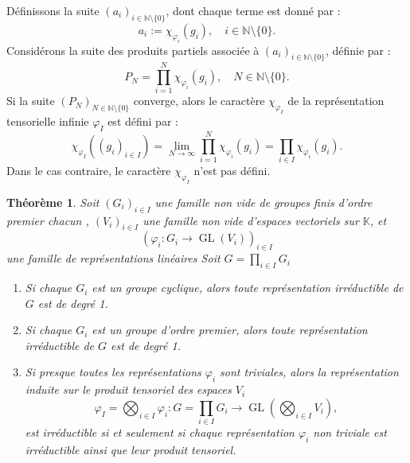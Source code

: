 \documentclass[9pt]{beamer}
\newtheorem{theoreme}{Théorème}
\begin{document}
\begin{frame}
	Définissons la suite \( (a_i)_{i \in \mathbb{N} \setminus \{0\} } \), dont chaque terme est donné par :
\[
a_i := \chi_{\varphi_i}(g_i), \quad i \in \mathbb{N} \setminus \{0\}.
\]
Considérons la suite des produits partiels associée à \( (a_i)_{i \in \mathbb{N} \setminus \{0\}} \), définie par :
\[
P_N = \prod_{i=1}^{N} \chi_{\varphi_i}(g_i), \quad N \in \mathbb{N} \setminus \{0\}.
\]
Si la suite \( (P_N)_{N \in \mathbb{N} \setminus \{0\}} \) converge, alors le caractère \( \chi_{\varphi_I} \) de la représentation tensorielle infinie \( \varphi_I \) est défini par :
\[
\chi_{\varphi_I}((g_i)_{i \in I}) = \lim_{N \to \infty} \prod_{i=1}^{N} \chi_{\varphi_i}(g_i) = \prod_{i \in I} \chi_{\varphi_i}(g_i).
\]	
Dans le cas contraire, le caractère \( \chi_{\varphi_I} \) n’est pas défini.
\end{frame}


\begin{frame}
	\begin{theoreme} 
Soit \( (G_i)_{i \in I} \) une famille non vide de groupes finis d'ordre premier chacun , \((V_i)_{i \in I} \) une famille  non vide d'espaces vectoriels sur  \(\mathbb{K}\), et  
	\[ (
	\varphi_i : G_i \to \operatorname{GL}(V_i) )_{i \in I}
	\]
	une famille de représentations linéaires
	Soit \( G =  \prod_{i \in I} G_i \)
	\begin{enumerate} [label=\roman*)]
		\item Si chaque \(G_i\) est un groupe cyclique, alors toute représentation irréductible de \( G\) est de degré 1.
		\item Si chaque \(G_i\) est un groupe d'ordre premier, alors toute représentation irréductible de \( G\) est de degré 1.
		\item Si presque toutes les représentations \( \varphi_i \) sont triviales, alors la représentation induite sur le produit tensoriel des espaces \( V_i \)
		\[
		\varphi_I = \bigotimes_{i \in I} \varphi_i : G = \prod_{i \in I} G_i \longrightarrow \operatorname{GL} \left( \bigotimes_{i \in I} V_i \right),
		\]
		est irréductible si et seulement si chaque représentation \( \varphi_i \) non triviale est irréductible ainsi que leur produit tensoriel.
	\end{enumerate} 	
\end{theoreme}
\end{frame}
\end{document}
